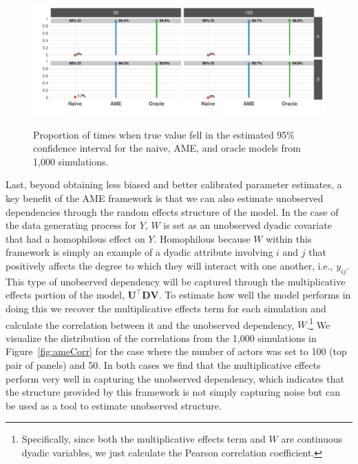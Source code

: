 \begin{figure}
	\centering
	\caption{Proportion of times when true value fell in the estimated 95\% confidence interval for the naive, AME, and oracle models from 1,000 simulations.}
	\label{fig:ameCalib}
	\includegraphics[width=1\textwidth]{ameSimCover_all.pdf} \\
\end{figure}

Last, beyond obtaining less biased and better calibrated parameter estimates, a key benefit of the AME framework is that we can also estimate unobserved dependencies through the random effects structure of the model. In the case of the data generating process for $Y$, $W$ is set as an unobserved dyadic covariate that had a homophilous effect on $Y$. Homophilous because $W$ within this framework is simply an example of a dyadic attribute involving $i$ and $j$ that positively affects the degree to which they will interact with one another, i.e., $y_{ij}$. This type of unobserved dependency will be captured through the multiplicative effects portion of the model, $\mathbf{U}^{\top} \mathbf{D} \mathbf{V}$. To estimate how well the model performs in doing this we recover the multiplicative effects term for each simulation and calculate the correlation between it and the unobserved dependency, $W$.\footnote{Specifically, since both the multiplicative effects term and $W$ are continuous dyadic variables, we just calculate the Pearson correlation coefficient.} We visualize the distribution of the correlations from the 1,000 simulations in Figure~\ref{fig:ameCorr} for the case where the number of actors was set to 100 (top pair of panels) and 50. In both cases we find that the multiplicative effects perform very well in capturing the unobserved dependency, which indicates that the structure provided by this framework is not simply capturing noise but can be used as a tool to estimate unobserved structure. 

